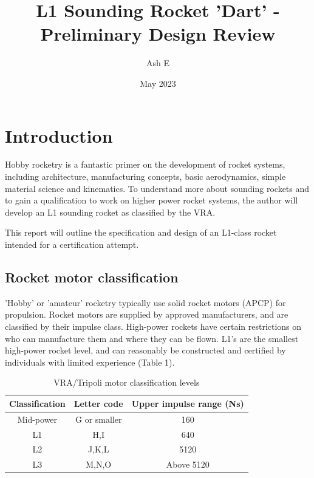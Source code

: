 \documentclass{article}
\title{L1 Sounding Rocket 'Dart' - Preliminary Design Review}
\author{Ash E}
\date{May 2023}
\begin{document}
\maketitle

\section{Introduction}


Hobby rocketry is a fantastic primer on the development of rocket systems, 
including architecture, 
manufacturing concepts, 
basic aerodynamics, 
simple material science 
and kinematics. 
To understand more about sounding rockets 
and to gain a qualification to work on higher power rocket systems, 
the author will develop an L1 sounding rocket as classified by the VRA.


This report will outline the specification and design 
of an L1-class rocket intended for a certification attempt.

\subsection{Rocket motor classification}


'Hobby' or 'amateur' rocketry typically use solid rocket motors (APCP) for propulsion. 
Rocket motors are supplied by approved manufacturers, 
and are classified by their impulse class. 
High-power rockets have certain restrictions on who can manufacture them 
and where they can be flown. 
L1's are the smallest high-power rocket level, 
and can reasonably be constructed 
and certified by individuals with limited experience (Table 1).

\begin{table}[]
    \centering
    \begin{tabular}{c|c|c}
         Classification & Letter code & Upper impulse range (Ns) \\
         \hline
         Mid-power & G or smaller & 160 \\
         L1 & H,I & 640 \\
         L2 & J,K,L & 5120 \\
         L3 & M,N,O & Above 5120\\
    \end{tabular}
    \caption{VRA/Tripoli motor classification levels}
    \label{tab:my_label}
\end{table}
\end{document}

